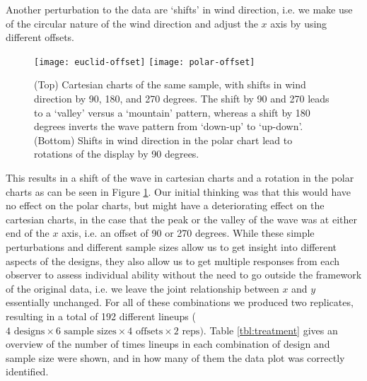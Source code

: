 Another perturbation to the data are `shifts' in wind direction, i.e. we make use of the circular nature of the wind direction and adjust the $x$ axis by using different offsets.

\begin{figure}[htbp] %
   \centering
   \texttt{[image: euclid-offset]} 
   \texttt{[image: polar-offset]} 
   \caption{ \label{fig:offset} (Top) Cartesian charts of the same sample, with shifts in wind direction by 90, 180, and 270 degrees. The shift by 90 and 270 leads to a `valley' versus a `mountain' pattern, whereas a shift by 180 degrees inverts the wave pattern from `down-up' to `up-down'. %
      (Bottom) Shifts in wind direction in the polar chart lead to rotations of the display by 90 degrees.}
\end{figure}

 This results in a shift of the wave in cartesian charts and a rotation in the polar charts as can be seen in Figure \ref{fig:offset}. Our initial thinking was that this would have no effect on the polar charts, but might have a deteriorating effect on the cartesian charts, in the case that the peak or the valley of the wave was at either end of the $x$ axis, i.e. an offset of 90 or 270 degrees. 
While these simple perturbations and different sample sizes allow us to get insight into different aspects of the designs, they also allow us to get multiple responses from each observer to assess individual ability without the need to go outside the framework of the original data, i.e. we leave the joint relationship between $x$ and $y$ essentially unchanged. For all of these combinations we produced two replicates, resulting in a total of 192 different lineups ($ 4 \text{ designs} \times 6 \text{ sample sizes} \times 4 \text{ offsets} \times 2 \text{ reps})$.
Table \ref{tbl:treatment} gives an overview of the number of times lineups in each combination of design and sample size were shown, and in how many of them the data plot was correctly identified. 

